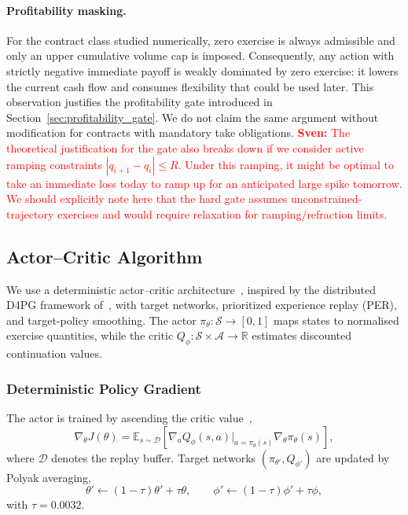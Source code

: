 \documentclass[a4paper,fleqn]{cas-dc}
\begin{document}
\paragraph{Profitability masking.}
For the contract class studied numerically, zero exercise is always admissible and only an upper cumulative volume cap is imposed. Consequently, any action with strictly negative immediate payoff is weakly dominated by zero exercise: it lowers the current cash flow and consumes flexibility that could be used later. This observation justifies the profitability gate introduced in Section~\ref{sec:profitability_gate}. We do not claim the same argument without modification for contracts with mandatory take obligations. \textcolor{red}{\textbf{Sven:} The theoretical justification for the gate also breaks down if we consider active ramping constraints $|q_{i+1}-q_i| \leq R$. Under this ramping, it might be optimal to take an immediate loss today to ramp up for an anticipated large spike tomorrow. We should explicitly note here that the hard gate assumes unconstrained-trajectory exercises and would require relaxation for ramping/refraction limits.}

\subsection{Actor--Critic Algorithm}
\label{sec:actor_critic}

We use a deterministic actor--critic architecture~\cite{silver2014dpg}, inspired by the distributed D4PG framework of~\cite{barth2018d4pg}, with target networks, prioritized experience replay (PER), and target-policy smoothing. The actor $\pi_\theta : \mathcal{S} \to [0,1]$ maps states to normalised exercise quantities, while the critic $Q_\phi : \mathcal{S} \times \mathcal{A} \to \mathbb{R}$ estimates discounted continuation values.

\subsubsection{Deterministic Policy Gradient}

The actor is trained by ascending the critic value~\cite{silver2014dpg},
\[
\nabla_\theta J(\theta)
=
\mathbb{E}_{s \sim \mathcal{D}}
\left[
\nabla_a Q_\phi(s,a)\big|_{a=\pi_\theta(s)}
\nabla_\theta \pi_\theta(s)
\right],
\]
where $\mathcal{D}$ denotes the replay buffer. Target networks $(\pi_{\theta'},Q_{\phi'})$ are updated by Polyak averaging,
\[
\theta' \leftarrow (1-\tau)\theta' + \tau \theta,
\qquad
\phi' \leftarrow (1-\tau)\phi' + \tau \phi,
\]
with $\tau = 0.0032$.
\end{document}
